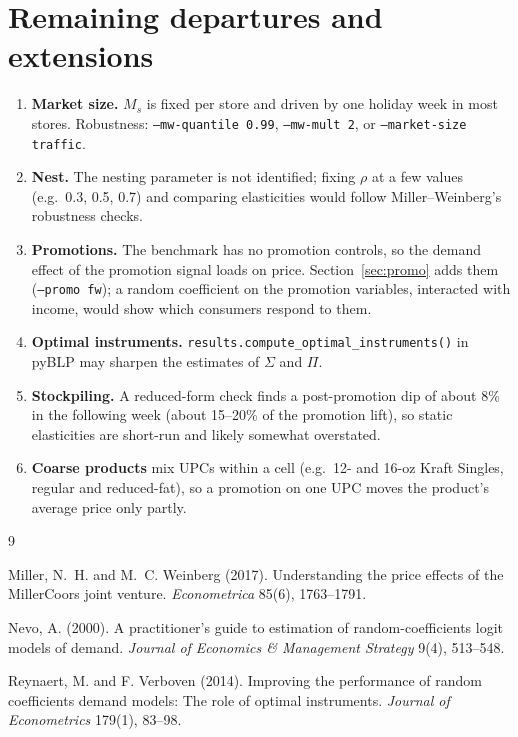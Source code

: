 \documentclass[11pt]{article}
\newcommand{\code}[1]{\texttt{#1}}
\begin{document}
\section{Remaining departures and extensions}\label{sec:extensions}

\begin{enumerate}
  \item \textbf{Market size.} $M_s$ is fixed per store and driven by one holiday week in most
        stores. Robustness: \code{--mw-quantile 0.99}, \code{--mw-mult 2}, or
        \code{--market-size traffic}.
  \item \textbf{Nest.} The nesting parameter is not identified; fixing $\rho$ at a few values
        (e.g.\ 0.3, 0.5, 0.7) and comparing elasticities would follow Miller--Weinberg's
        robustness checks.
  \item \textbf{Promotions.} The benchmark has no promotion controls, so the demand effect of
        the promotion signal loads on price. Section~\ref{sec:promo} adds them
        (\code{--promo fw}); a random coefficient on the promotion variables, interacted with
        income, would show which consumers respond to them.
  \item \textbf{Optimal instruments.} \code{results.compute\_optimal\_instruments()} in pyBLP
        \citep{rv2014} may sharpen the estimates of $\Sigma$ and $\Pi$.
  \item \textbf{Stockpiling.} A reduced-form check finds a post-promotion dip of about 8\% in
        the following week (about 15--20\% of the promotion lift), so static elasticities are
        short-run and likely somewhat overstated.
  \item \textbf{Coarse products} mix UPCs within a cell (e.g.\ 12- and 16-oz Kraft Singles,
        regular and reduced-fat), so a promotion on one UPC moves the product's average price
        only partly.
\end{enumerate}

\begin{thebibliography}{9}

Miller, N.~H. and M.~C. Weinberg (2017).
\newblock Understanding the price effects of the MillerCoors joint venture.
\newblock \emph{Econometrica} 85(6), 1763--1791.

Nevo, A. (2000).
\newblock A practitioner's guide to estimation of random-coefficients logit models of demand.
\newblock \emph{Journal of Economics \& Management Strategy} 9(4), 513--548.

Reynaert, M. and F. Verboven (2014).
\newblock Improving the performance of random coefficients demand models: The role of optimal
  instruments.
\newblock \emph{Journal of Econometrics} 179(1), 83--98.

\end{thebibliography}
\end{document}
